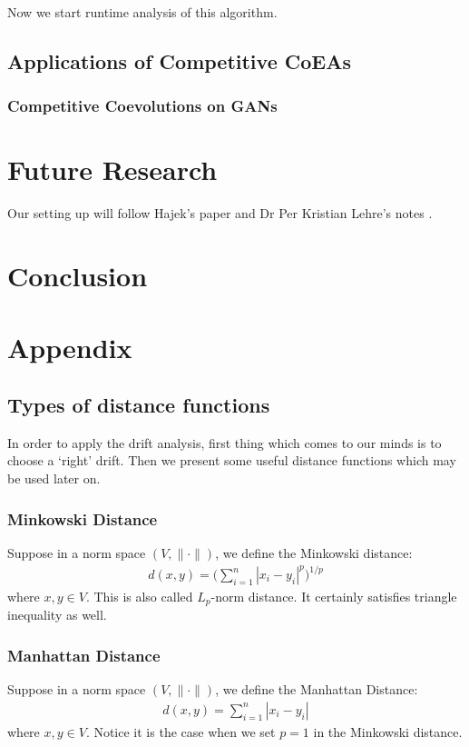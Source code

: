 \documentclass[a4paper,11pt]{report}
\theoremstyle{plain} %
\theoremstyle{definition} %
\theoremstyle{remark} %
\begin{document}
Now we start runtime analysis of this algorithm.

\section{Applications of Competitive CoEAs}
\subsection{Competitive Coevolutions on GANs}




\chapter{Future Research}
Our setting up will follow Hajek's paper \citep{hajek1982hitting} and Dr Per Kristian Lehre's notes \citep{Per}.


\chapter{Conclusion}

\chapter{Appendix}
\section{Types of distance functions}
\par In order to apply the drift analysis, first thing which comes to our minds is to choose a `right' drift. Then we present some useful distance functions which may be used later on.

\subsection{Minkowski Distance}
\par Suppose in a norm space $(V,\lVert \cdot \rVert)$, we define the Minkowski distance:
\begin{align*}
    d(x,y) = \big( \sum_{i=1}^n |x_{i} - y_{i}|^p  \big)^{1/p}
\end{align*}
where $x,y \in V$. This is also called $L_{p}$-norm distance. It certainly satisfies triangle inequality as well.


\subsection{Manhattan Distance} 
\par  Suppose in a norm space $(V,\lVert \cdot \rVert)$, we define the Manhattan Distance:
\begin{align*}
    d(x,y) = \sum_{i=1}^n |x_{i} - y_{i}|  
\end{align*}
where $x,y \in V$. Notice it is the case when we set $p=1$ in the Minkowski distance.
\end{document}
